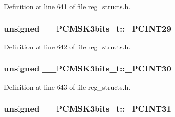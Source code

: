 Definition at line 641 of file reg\+\_\+structs.\+h.

\hypertarget{union_____p_c_m_s_k3bits__t_a71a34315734b61d8b5c1a5840a09bff8}{
\subsubsection[{\+\_\+\+P\+C\+I\+N\+T29}]{\setlength{\rightskip}{0pt plus 5cm}unsigned \+\_\+\+\_\+\+P\+C\+M\+S\+K3bits\+\_\+t\+::\+\_\+\+P\+C\+I\+N\+T29}}\label{union_____p_c_m_s_k3bits__t_a71a34315734b61d8b5c1a5840a09bff8}


Definition at line 642 of file reg\+\_\+structs.\+h.

\hypertarget{union_____p_c_m_s_k3bits__t_ab0f59eb8b923e669796cdddd9f7aa208}{
\subsubsection[{\+\_\+\+P\+C\+I\+N\+T30}]{\setlength{\rightskip}{0pt plus 5cm}unsigned \+\_\+\+\_\+\+P\+C\+M\+S\+K3bits\+\_\+t\+::\+\_\+\+P\+C\+I\+N\+T30}}\label{union_____p_c_m_s_k3bits__t_ab0f59eb8b923e669796cdddd9f7aa208}


Definition at line 643 of file reg\+\_\+structs.\+h.

\hypertarget{union_____p_c_m_s_k3bits__t_ae72615601aeba43313c29c13b6e00fb6}{
\subsubsection[{\+\_\+\+P\+C\+I\+N\+T31}]{\setlength{\rightskip}{0pt plus 5cm}unsigned \+\_\+\+\_\+\+P\+C\+M\+S\+K3bits\+\_\+t\+::\+\_\+\+P\+C\+I\+N\+T31}}\label{union_____p_c_m_s_k3bits__t_ae72615601aeba43313c29c13b6e00fb6}


